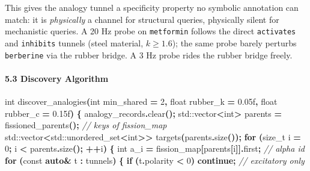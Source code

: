 \documentclass[
  11pt,
  a4paper,
]{article}
\newenvironment{Shaded}{\begin{snugshade}}{\end{snugshade}}
\newcommand{\AttributeTok}[1]{\textcolor[rgb]{0.13,0.29,0.53}{#1}}
\newcommand{\BuiltInTok}[1]{#1}
\newcommand{\CommentTok}[1]{\textcolor[rgb]{0.56,0.35,0.01}{\textit{#1}}}
\newcommand{\ControlFlowTok}[1]{\textcolor[rgb]{0.13,0.29,0.53}{\textbf{#1}}}
\newcommand{\DataTypeTok}[1]{\textcolor[rgb]{0.13,0.29,0.53}{#1}}
\newcommand{\DecValTok}[1]{\textcolor[rgb]{0.00,0.00,0.81}{#1}}
\newcommand{\FloatTok}[1]{\textcolor[rgb]{0.00,0.00,0.81}{#1}}
\newcommand{\KeywordTok}[1]{\textcolor[rgb]{0.13,0.29,0.53}{\textbf{#1}}}
\newcommand{\NormalTok}[1]{#1}
\newcommand{\OperatorTok}[1]{\textcolor[rgb]{0.81,0.36,0.00}{\textbf{#1}}}
\begin{document}
This gives the analogy tunnel a specificity property no symbolic
annotation can match: it is \emph{physically} a channel for structural
queries, physically silent for mechanistic queries. A 20 Hz probe on
\texttt{metformin} follows the direct \texttt{activates} and
\texttt{inhibits} tunnels (steel material, \(k \geq 1.6\)); the same
probe barely perturbs \texttt{berberine} via the rubber bridge. A 3 Hz
probe rides the rubber bridge freely.

\paragraph{5.3 Discovery Algorithm}\label{discovery-algorithm}

\begin{Shaded}
\begin{Highlighting}[]
\DataTypeTok{int}\NormalTok{ discover\_analogies}\OperatorTok{(}\DataTypeTok{int}\NormalTok{ min\_shared }\OperatorTok{=} \DecValTok{2}\OperatorTok{,}
                       \DataTypeTok{float}\NormalTok{ rubber\_k }\OperatorTok{=} \FloatTok{0.05}\BuiltInTok{f}\OperatorTok{,} \DataTypeTok{float}\NormalTok{ rubber\_c }\OperatorTok{=} \FloatTok{0.15}\BuiltInTok{f}\OperatorTok{)}
\OperatorTok{\{}
\NormalTok{    analogy\_records}\OperatorTok{.}\NormalTok{clear}\OperatorTok{();}
    \BuiltInTok{std::}\NormalTok{vector}\OperatorTok{\textless{}}\DataTypeTok{int}\OperatorTok{\textgreater{}}\NormalTok{ parents }\OperatorTok{=}\NormalTok{ fissioned\_parents}\OperatorTok{();}     \CommentTok{// keys of fission\_map}
    \BuiltInTok{std::}\NormalTok{vector}\OperatorTok{\textless{}}\BuiltInTok{std::}\NormalTok{unordered\_set}\OperatorTok{\textless{}}\DataTypeTok{int}\OperatorTok{\textgreater{}\textgreater{}}\NormalTok{ targets}\OperatorTok{(}\NormalTok{parents}\OperatorTok{.}\NormalTok{size}\OperatorTok{());}
    \ControlFlowTok{for} \OperatorTok{(}\DataTypeTok{size\_t}\NormalTok{ i }\OperatorTok{=} \DecValTok{0}\OperatorTok{;}\NormalTok{ i }\OperatorTok{\textless{}}\NormalTok{ parents}\OperatorTok{.}\NormalTok{size}\OperatorTok{();} \OperatorTok{++}\NormalTok{i}\OperatorTok{)} \OperatorTok{\{}
        \DataTypeTok{int}\NormalTok{ a\_i }\OperatorTok{=}\NormalTok{ fission\_map}\OperatorTok{[}\NormalTok{parents}\OperatorTok{[}\NormalTok{i}\OperatorTok{]].}\NormalTok{first}\OperatorTok{;}        \CommentTok{// alpha id}
        \ControlFlowTok{for} \OperatorTok{(}\AttributeTok{const} \KeywordTok{auto}\OperatorTok{\&}\NormalTok{ t }\OperatorTok{:}\NormalTok{ tunnels}\OperatorTok{)} \OperatorTok{\{}
            \ControlFlowTok{if} \OperatorTok{(}\NormalTok{t}\OperatorTok{.}\NormalTok{polarity }\OperatorTok{\textless{}} \DecValTok{0}\OperatorTok{)} \ControlFlowTok{continue}\OperatorTok{;}               \CommentTok{// excitatory only}

\end{Highlighting}
\end{Shaded}
\end{document}
